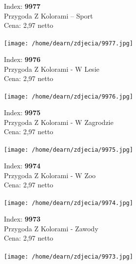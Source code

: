 {Index: \textbf{9977}\\
Przygoda Z Kolorami – Sport\\
Cena: 2,97 netto   \\\\  \texttt{[image: /home/dearn/zdjecia/9977.jpg]}}\newline\newline

{Index: \textbf{9976}\\
Przygoda Z Kolorami - W Lesie\\
Cena: 2,97 netto   \\\\  \texttt{[image: /home/dearn/zdjecia/9976.jpg]}}\newline\newline

{Index: \textbf{9975}\\
Przygoda Z Kolorami - W Zagrodzie \\
Cena: 2,97 netto   \\\\  \texttt{[image: /home/dearn/zdjecia/9975.jpg]}}\newline\newline

{Index: \textbf{9974}\\
Przygoda Z Kolorami - W Zoo \\
Cena: 2,97 netto   \\\\  \texttt{[image: /home/dearn/zdjecia/9974.jpg]}}\newline\newline

{Index: \textbf{9973}\\
Przygoda Z Kolorami - Zawody \\
Cena: 2,97 netto   \\\\  \texttt{[image: /home/dearn/zdjecia/9973.jpg]}}\newline\newline
